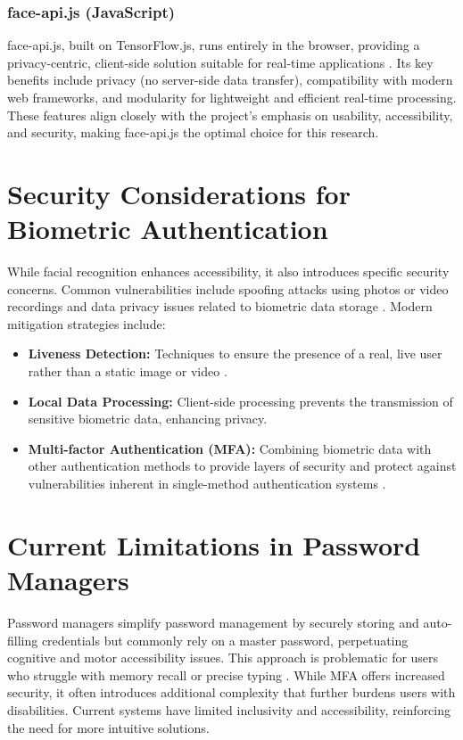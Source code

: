 \subsubsection{face-api.js (JavaScript)}
face-api.js, built on TensorFlow.js, runs entirely in the browser, providing a privacy-centric, client-side solution suitable for real-time applications \autocite{Vageele2024}. Its key benefits include privacy (no server-side data transfer), compatibility with modern web frameworks, and modularity for lightweight and efficient real-time processing. These features align closely with the project's emphasis on usability, accessibility, and security, making face-api.js the optimal choice for this research.

\section{Security Considerations for Biometric Authentication}
While facial recognition enhances accessibility, it also introduces specific security concerns. Common vulnerabilities include spoofing attacks using photos or video recordings and data privacy issues related to biometric data storage \autocite{Bowyer2006, Bahia2024}. Modern mitigation strategies include:
\begin{itemize}
\item \textbf{Liveness Detection:} Techniques to ensure the presence of a real, live user rather than a static image or video \autocite{Kuznetsov2024}.
\item \textbf{Local Data Processing:} Client-side processing prevents the transmission of sensitive biometric data, enhancing privacy.
\item \textbf{Multi-factor Authentication (MFA):} Combining biometric data with other authentication methods to provide layers of security and protect against vulnerabilities inherent in single-method authentication systems \autocite{Furnell2022}.
\end{itemize}

\section{Current Limitations in Password Managers}
Password managers simplify password management by securely storing and auto-filling credentials but commonly rely on a master password, perpetuating cognitive and motor accessibility issues. This approach is problematic for users who struggle with memory recall or precise typing \autocite{IALabs2024}. While MFA offers increased security, it often introduces additional complexity that further burdens users with disabilities. Current systems have limited inclusivity and accessibility, reinforcing the need for more intuitive solutions.

